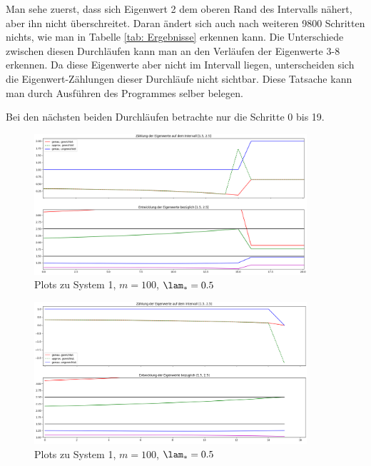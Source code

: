 \documentclass[a4paper,12pt]{report}
\newcommand{\1}{\mathds{1}}
\theoremstyle{plain} %
\theoremstyle{definition} %
\theoremstyle{remark}
\begin{document}
            Man sehe zuerst, dass sich Eigenwert 2 dem oberen Rand des Intervalls nähert, aber ihn nicht überschreitet.
            Daran ändert sich auch nach weiteren 9800 Schritten nichts, wie man in Tabelle \ref{tab: Ergebnisse} erkennen kann.
            Die Unterschiede zwischen diesen Durchläufen kann man an den Verläufen der Eigenwerte 3-8 erkennen.
            Da diese Eigenwerte aber nicht im Intervall liegen, unterscheiden sich die Eigenwert-Zählungen dieser Durchläufe nicht sichtbar.
            Diese Tatsache kann man durch Ausführen des Programmes selber belegen.

            Bei den nächsten beiden Durchläufen betrachte nur die Schritte 0 bis 19. 

            \begin{figure}[ht]
                  \centering
                  \includegraphics[width=0.9\textwidth, keepaspectratio]{./Original/Plot_1_100_0.5.png}
                  \caption{Plots zu System 1, $m=100$, $\lam_*=0.5$}
                  \label{fig: Plot_1_100_0.5}
            \end{figure}

            \begin{figure}[ht]
                  \centering
                  \includegraphics[width=0.9\textwidth, keepaspectratio]{./Original/Plot_1_150_0.5.png}
                  \caption{Plots zu System 1, $m=100$, $\lam_*=0.5$}
                  \label{fig: Plot_1_150_0.5}
            \end{figure}
\end{document}
